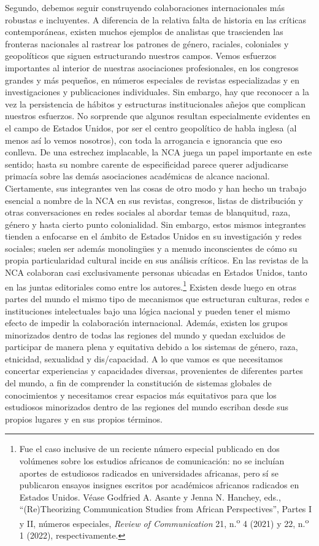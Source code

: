 \documentclass{tufte-handout}
\begin{document}
Segundo, debemos seguir construyendo colaboraciones internacionales más
robustas e incluyentes. A diferencia de la relativa falta de historia en
las críticas contemporáneas, existen muchos ejemplos de analistas que
trascienden las fronteras nacionales al rastrear los patrones de género,
raciales, coloniales y geopolíticos que siguen estructurando nuestros
campos. Vemos esfuerzos importantes al interior de nuestras asociaciones
profesionales, en los congresos grandes y más pequeños, en números
especiales de revistas especializadas y en investigaciones y
publicaciones individuales. Sin embargo, hay que reconocer a la vez la
persistencia de hábitos y estructuras institucionales añejos que
complican nuestros esfuerzos. No sorprende que algunos resultan
especialmente evidentes en el campo de Estados Unidos, por ser el centro
geopolítico de habla inglesa (al menos así lo vemos nosotros), con toda
la arrogancia e ignorancia que eso conlleva. De una estrechez
implacable, la NCA juega un papel importante en este sentido; hasta su
nombre carente de especificidad parece querer adjudicarse primacía sobre
las demás asociaciones académicas de alcance nacional. Ciertamente, sus
integrantes ven las cosas de otro modo y han hecho un trabajo esencial a
nombre de la NCA en sus revistas, congresos, listas de distribución y
otras conversaciones en redes sociales al abordar temas de blanquitud,
raza, género y hasta cierto punto colonialidad. Sin embargo, estos
mismos integrantes tienden a enfocarse en el ámbito de Estados Unidos en
su investigación y redes sociales; suelen ser además monolingües y a
menudo inconscientes de cómo su propia particularidad cultural incide en
sus análisis críticos. En las revistas de la NCA colaboran casi
exclusivamente personas ubicadas en Estados Unidos, tanto en las juntas
editoriales como entre los autores.\footnote{Fue el caso inclusive de un
  reciente número especial publicado en dos volúmenes sobre los estudios
  africanos de comunicación: no se incluían aportes de estudiosos
  radicados en universidades africanas, pero sí se publicaron ensayos
  insignes escritos por académicos africanos radicados en Estados
  Unidos. Véase Godfried A. Asante y Jenna N. Hanchey, eds.,
  ``(Re)Theorizing Communication Studies from African Perspectives'',
  Partes I y II, números especiales, \emph{Review of Communication} 21,
  n.\textsuperscript{o} 4 (2021) y 22, n.\textsuperscript{o} 1 (2022),
  respectivamente.} Existen desde luego en otras partes del mundo el
mismo tipo de mecanismos que estructuran culturas, redes e instituciones
intelectuales bajo una lógica nacional y pueden tener el mismo efecto de
impedir la colaboración internacional. Además, existen los grupos
minorizados dentro de todas las regiones del mundo y quedan excluidos de
participar de manera plena y equitativa debido a los sistemas de género,
raza, etnicidad, sexualidad y dis/capacidad. A lo que vamos es que
necesitamos concertar experiencias y capacidades diversas, provenientes
de diferentes partes del mundo, a fin de comprender la constitución de
sistemas globales de conocimientos y necesitamos crear espacios más
equitativos para que los estudiosos minorizados dentro de las regiones
del mundo escriban desde sus propios lugares y en sus propios términos.
\end{document}
